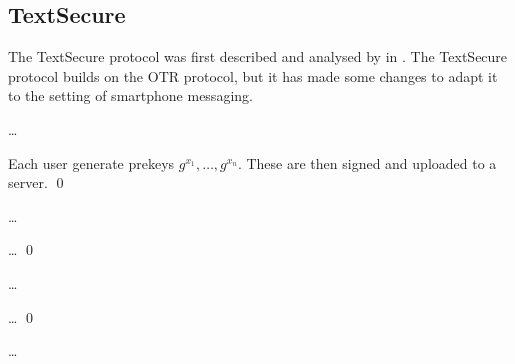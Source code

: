 %
%
%
%

\subsection{TextSecure}

The TextSecure protocol was first described and analysed by 
\citeauthor{frosch2014secure} in \cite{frosch2014secure}.
The TextSecure protocol builds on the \ac{OTR} protocol, but it has made some 
changes to adapt it to the setting of smartphone messaging.

\dots

\begin{protocol}
  Each user generate prekeys \(g^{x_1}, \ldots, g^{x_n}\).
  These are then signed and uploaded to a server.
  \qed
\end{protocol}

\dots

\begin{protocol}
  \dots
  \qed
\end{protocol}

\dots

\begin{protocol}
  \dots
  \qed
\end{protocol}

\dots


%
%


